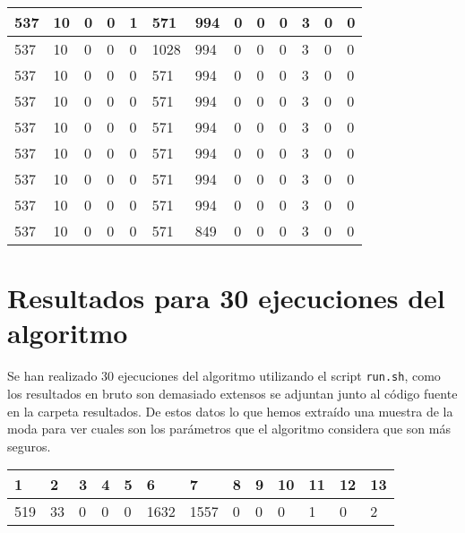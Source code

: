 \begin{table}[H]
\begin{tabular}{|l|l|l|l|l|l|l|l|l|l|l|l|l|}
537  &  10  &  0  &  0  &  1  &  571  &  994  &  0  &  0  &  0  &  3  &  0  &  0 \\ \hline
537  &  10  &  0  &  0  &  0  &  1028  &  994  &  0  &  0  &  0  &  3  &  0  &  0 \\ \hline
537  &  10  &  0  &  0  &  0  &  571  &  994  &  0  &  0  &  0  &  3  &  0  &  0 \\ \hline
537  &  10  &  0  &  0  &  0  &  571  &  994  &  0  &  0  &  0  &  3  &  0  &  0 \\ \hline
537  &  10  &  0  &  0  &  0  &  571  &  994  &  0  &  0  &  0  &  3  &  0  &  0 \\ \hline
537  &  10  &  0  &  0  &  0  &  571  &  994  &  0  &  0  &  0  &  3  &  0  &  0 \\ \hline
537  &  10  &  0  &  0  &  0  &  571  &  994  &  0  &  0  &  0  &  3  &  0  &  0 \\ \hline
537  &  10  &  0  &  0  &  0  &  571  &  994  &  0  &  0  &  0  &  3  &  0  &  0 \\ \hline
537  &  10  &  0  &  0  &  0  &  571  &  849  &  0  &  0  &  0  &  3  &  0  &  0 \\ \hline
\end{tabular}
\end{table}

\section{Resultados para 30 ejecuciones del algoritmo}

Se han realizado 30 ejecuciones del algoritmo utilizando el script \texttt{run.sh}, como los resultados en bruto son demasiado extensos se adjuntan junto al código fuente en la carpeta resultados. De estos datos lo que hemos extraído una muestra de la moda para ver cuales son los parámetros que el algoritmo considera que son más seguros.

\begin{table}[H]
\begin{tabular}{|l|l|l|l|l|l|l|l|l|l|l|l|l|}
\hline
\textbf{1} & \textbf{2} & \textbf{3} & \textbf{4} & \textbf{5} & \textbf{6} & \textbf{7} & \textbf{8} & \textbf{9} & \textbf{10} & \textbf{11} & \textbf{12} & \textbf{13} \\ \hline
519                          & 33                          & 0                          & 0                  & 0                      & 1632                                    & 1557                             & 0                       & 0             & 0                        & 1                     & 0                               & 2               \\ \hline
\end{tabular}
\end{table}

